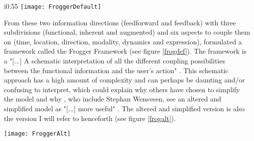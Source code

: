 \begin{wrapfigure}{i}{0.55\textwidth}
  \texttt{[image: FroggerDefault]}
  \caption{The Frogger Framework}
  \label{frogdef}
\end{wrapfigure}

From these two information directions (feedforward and feedback) with three subdivisions (functional, inherent and augmented) and six aspects to couple them on (time, location, direction, modality, dynamics and expression),  formulated a framework called the Frogger Framework (see figure \ref{frogdef}). The framework is a "[...] A schematic interpretation of all the different coupling possibilities between the functional information and the user’s action" \cite[p. 6]{frogger}. This schematic approach has a high amount of complexity and can perhaps be daunting and/or confusing to interpret, which could explain why others have chosen to simplify the model \cite{tangifrog} and why , who include Stephan Wensveen, see an altered and simplified model as "[...] more useful" . The altered and simplified version is also the version I will refer to henceforth (see figure \ref{frogalt}).

\begin{figure*}[!b]
  \texttt{[image: FroggerAlt]}
  \caption{The Alternate Frogger Framework}
  \label{frogalt}
\end{figure*}
